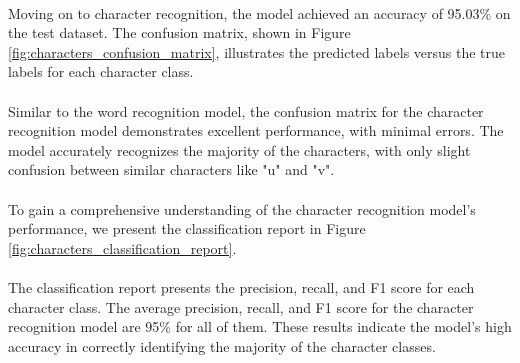 \paragraph{}
Moving on to character recognition, the model achieved an accuracy of 95.03\% on the test dataset. The confusion matrix, shown in Figure \ref{fig:characters_confusion_matrix}, illustrates the predicted labels versus the true labels for each character class.
\paragraph{}
Similar to the word recognition model, the confusion matrix for the character recognition model demonstrates excellent performance, with minimal errors. The model accurately recognizes the majority of the characters, with only slight confusion between similar characters like "u" and "v".
\paragraph{}
To gain a comprehensive understanding of the character recognition model's performance, we present the classification report in Figure \ref{fig:characters_classification_report}.
\paragraph{}
The classification report presents the precision, recall, and F1 score for each character class. The average precision, recall, and F1 score for the character recognition model are 95\% for all of them. These results indicate the model's high accuracy in correctly identifying the majority of the character classes.
